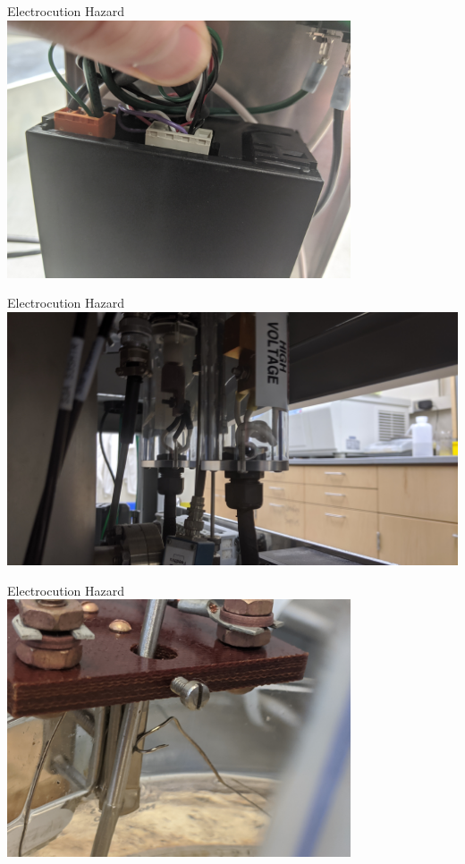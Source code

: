 \documentclass{presentation}
\begin{document}
\begin{frame}{Electrocution Hazard}
  \centering
  \includegraphics[height=3in]{"./IMG_20200106_153053.jpg"}
\end{frame}

\begin{frame}{Electrocution Hazard}
  \centering
  \includegraphics[width=\textwidth]{"./IMG_20191001_140050.jpg"}
\end{frame}

\begin{frame}{Electrocution Hazard}
  \centering
  \includegraphics[height=3in]{"./IMG_20200904_131436.jpg"}
\end{frame}
\end{document}
